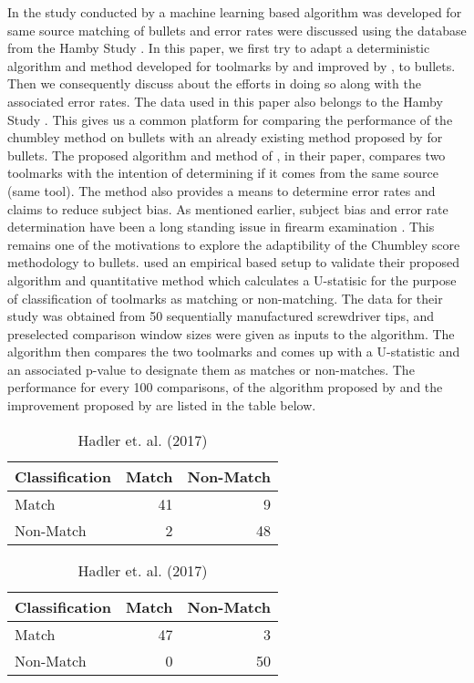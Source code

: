 \documentclass[12pt]{article}
\begin{document}
In the study conducted by \citet{aoas} a machine learning based
algorithm was developed for same source matching of bullets and error
rates were discussed using the database from the Hamby Study
\citep{hamby}. In this paper, we first try to adapt a deterministic
algorithm and method developed for toolmarks by \citet{chumbley} and
improved by \citet{hadler}, to bullets. Then we consequently discuss
about the efforts in doing so along with the associated error rates. The
data used in this paper also belongs to the Hamby Study \citep{hamby}.
This gives us a common platform for comparing the performance of the
chumbley method on bullets with an already existing method proposed by
\citet{aoas} for bullets. The proposed algorithm and method of
\citet{chumbley}, in their paper, compares two toolmarks with the
intention of determining if it comes from the same source (same tool).
The method also provides a means to determine error rates and claims to
reduce subject bias. As mentioned earlier, subject bias and error rate
determination have been a long standing issue in firearm examination
\citep{NAS:2009}. This remains one of the motivations to explore the
adaptibility of the Chumbley score methodology to bullets.
\citet{chumbley} used an empirical based setup to validate their
proposed algorithm and quantitative method which calculates a U-statisic
for the purpose of classification of toolmarks as matching or
non-matching. The data for their study was obtained from 50 sequentially
manufactured screwdriver tips, and preselected comparison window sizes
were given as inputs to the algorithm. The algorithm then compares the
two toolmarks and comes up with a U-statistic and an associated p-value
to designate them as matches or non-matches. The performance for every
100 comparisons, of the algorithm proposed by \citet{chumbley} and the
improvement proposed by \citet{hadler} are listed in the table below.

\begin{table}[!htb]
    \begin{minipage}{.5\linewidth}
      \caption{Chumbley et al. 2010}
      \centering 
\begin{tabular}{lrr}
\toprule
Classification & Match & Non-Match\\
\midrule
Match & 41 & 9\\
Non-Match & 2 & 48\\
\bottomrule
\end{tabular} \end{minipage}%
    \begin{minipage}{.5\linewidth}
      \centering
        \caption{Hadler et. al. (2017)} 
\begin{tabular}{lrr}
\toprule
Classification & Match & Non-Match\\
\midrule
Match & 47 & 3\\
Non-Match & 0 & 50\\
\bottomrule
\end{tabular} \end{minipage} 
\end{table}\newpage



\end{document}
